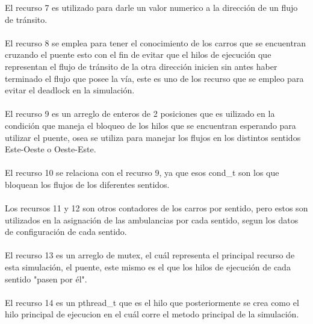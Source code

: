 \documentclass[10pt,a4paper]{article}
\begin{document}
El recurso 7 es utilizado para darle un valor numerico a la dirección de un flujo de tránsito.\\\\
El recurso 8 se emplea para tener el conocimiento de los carros que se encuentran cruzando el puente esto con el fin de evitar que el hilos de ejecución que representan el flujo de tránsito de la otra dirección inicien sin antes haber terminado el flujo que posee la vía, este es uno de los recurso que se empleo para evitar el deadlock en la simulación.\\\\
El recurso 9 es un arreglo de enteros de 2 posiciones que es uilizado en la condición que maneja el bloqueo de los hilos que se encuentran esperando para utilizar el puente, osea se utiliza para manejar los flujos en los distintos sentidos Este-Oeste o Oeste-Este.\\\\
El recurso 10 se relaciona con el recurso 9, ya que esos cond\_t son los que bloquean los flujos de los diferentes sentidos.\\\\
Los recursos 11 y 12 son otros contadores de los carros por sentido, pero estos son utilizados en la asignación de las ambulancias por cada sentido, segun los datos de configuración de cada sentido.\\\\
El recurso 13 es un arreglo de mutex, el cuál representa el principal recurso de esta simulación, el puente, este mismo es el que los hilos de ejecución de cada sentido "pasen por él".\\\\
El recurso 14 es un pthread\_t que es el hilo que posteriormente se crea como el hilo principal de ejecucion en el cuál corre el metodo principal de la simulación.\\
\end{document}
